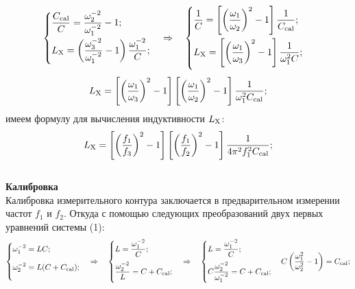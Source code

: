 \documentclass[12pt,a4paper]{article}
\newcommand{\ds}{\displaystyle}
\newcommand{\cc}{C_{\rm cal}}
\newcommand{\lx}{L_{\rm X}}
\begin{document}
	\begin{equation*} 
		\begin{cases}
			\ds \frac{\cc}{C} = \frac{\omega_2^{-2}}{\omega_1^{-2}} - 1; \\[9pt]
			\ds \lx = \left(\frac{\omega_3^{-2}}{\omega_1^{-2}} - 1\right)\frac{\omega_1^{-2}}{C}; \\[9pt]
		\end{cases} \Rightarrow \quad
		\begin{cases}
			\ds \frac{1}{C} = \left[{\left(\frac{\omega_1}{\omega_2}\right)}^2 - 1\right]\frac{1}{\cc}; \\[12pt]
			\ds \lx = \left[{\left(\frac{\omega_1}{\omega_3}\right)}^2 - 1\right]\frac{1}{\omega_1^2C}; \\[12pt]
		\end{cases}
	\end{equation*}
	\begin{equation*}
		\ds \lx = \left[{\left(\frac{\omega_1}{\omega_3}\right)}^2 - 1\right]\left[{\left(\frac{\omega_1}{\omega_2}\right)}^2 - 1\right]\frac{1}{\omega_1^2\cc};
	\end{equation*}
	имеем формулу для вычисления индуктивности $\lx$:
	\begin{equation}
		\ds \lx = \left[{\left(\frac{f_1}{f_3}\right)}^2 - 1\right]\left[{\left(\frac{f_1}{f_2}\right)}^2 - 1\right]\frac{1}{4\pi^2f_1^2\cc};
	\end{equation}
	\\
	\textbf{Калибровка} \\
	Калибровка измерительного контура заключается в 
	предварительном измерении частот $f_1$ и $f_2$.
	Откуда с помощью следующих преобразований двух
	первых уравнений системы (1): \\
	\begin{equation*}
		\begin{cases}
			\ds \omega_1^{-2} = LC; \\[9pt]
			\ds \omega_2^{-2} = L(C+\cc); \\[9pt]
		\end{cases} \Rightarrow \quad
		\begin{cases}
			\ds L = \frac{\omega_1^{-2}}{C}; \\[9pt]
			\ds \frac{\omega_2^{-2}}{L} = C+\cc; \\[9pt]
		\end{cases} \Rightarrow \quad
		\begin{cases}
			\ds L = \frac{\omega_1^{-2}}{C}; \\[9pt]
			\ds C\frac{\omega_2^{-2}}{\omega_1^{-2}} = C+\cc; \\[9pt]
		\end{cases}
		\ds C\left(\frac{\omega_1^2}{\omega_2^2}-1\right) = \cc;
	\end{equation*}
\end{document}
